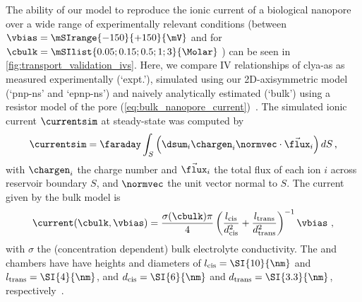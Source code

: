 The ability of our model to reproduce the ionic current of a biological nanopore over a wide range of
experimentally relevant conditions (between $\vbias = \mSIrange{-150}{+150}{\mV}$ and for $\cbulk =
\mSIlist{0.05;0.15;0.5;1;3}{\Molar}$ ) can be seen in \cref{fig:transport_validation_ivs}. Here, we
compare IV relationships of \gls{clya-as} as measured experimentally (`expt.'), simulated using our
2D-axisymmetric model (`\gls{pnp-ns}' and `\gls{epnp-ns}') and naively analytically estimated (`bulk') using a
resistor model of the pore (\cref{eq:bulk_nanopore_current})~\cite{Soskine-2013,Kowalczyk-2011}. The simulated
ionic current $\currentsim$ at steady-state was computed by
%
\begin{align}\label{eq:currentsim}
  \currentsim = \faraday\int_{S}\left(\dsum_{i}\chargen_{i}\normvec\cdot\vec{\flux}_{i}\right)dS
  \text{\,,}
\end{align}
%
with $\chargen_{i}$ the charge number and $\vec{\flux}_{i}$ the total flux of each ion $i$ across \cisi{}
reservoir boundary $S$, and $\normvec$ the unit vector normal to $S$. The current given by the bulk model is
%
\begin{align}\label{eq:bulk_nanopore_current}
  \current(\cbulk,\vbias) = 
      \dfrac{\sigma (\cbulk) \pi}{4}
      \left( 
          \dfrac{ l_{\text{cis}} }{ d_{\text{cis}}^2 } +
          \dfrac{ l_{\text{trans}} }{ d_{\text{trans}}^2 }
      \right)^{-1}
      \vbias
      \text{ ,}
\end{align}
%
with $\sigma$ the (concentration dependent) bulk electrolyte conductivity. The \cisi{} and \transi{} chambers
have have heights and diameters of $l_{\text{cis}}=\text{\SI{10}{\nm}}$ and
$l_{\text{trans}}=\text{\SI{4}{\nm}}$, and $d_{\text{cis}}=\text{\SI{6}{\nm}}$ and
$d_{\text{trans}}=\text{\SI{3.3}{\nm}}$, respectively~\cite{Soskine-2013}.



